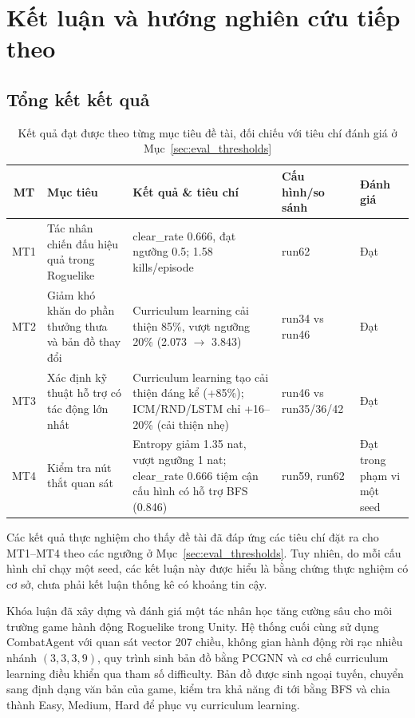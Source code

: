 \clearpage
{}

\setcounter{chapter}{4}
\chapter[{KẾT LUẬN VÀ HƯỚNG NGHIÊN CỨU TIẾP THEO}]{Kết luận và hướng nghiên cứu tiếp theo}

\section{Tổng kết kết quả}

\begin{table}[H]
    \centering
    \small
    \caption{Kết quả đạt được theo từng mục tiêu đề tài, đối chiếu với tiêu chí đánh giá ở Mục~\ref{sec:eval_thresholds}}
    \label{tab:mt_results_summary}
    \begin{tabular}{|c|p{3.8cm}|p{4.0cm}|p{2.3cm}|p{1.6cm}|}
        \hline
        \textbf{MT} & \textbf{Mục tiêu} & \textbf{Kết quả \& tiêu chí} & \textbf{Cấu hình/so sánh} & \textbf{Đánh giá} \\
        \hline
        MT1 & Tác nhân chiến đấu hiệu quả trong Roguelike & clear\_rate 0.666, đạt ngưỡng 0.5; 1.58 kills/episode & run62 & Đạt \\
        \hline
        MT2 & Giảm khó khăn do phần thưởng thưa và bản đồ thay đổi & Curriculum learning cải thiện 85\%, vượt ngưỡng 20\% (2.073 $\rightarrow$ 3.843) & run34 vs run46 & Đạt \\
        \hline
        MT3 & Xác định kỹ thuật hỗ trợ có tác động lớn nhất & Curriculum learning tạo cải thiện đáng kể (+85\%); ICM/RND/LSTM chỉ +16--20\% (cải thiện nhẹ) & run46 vs run35/36/42 & Đạt \\
        \hline
        MT4 & Kiểm tra nút thắt quan sát & Entropy giảm 1.35 nat, vượt ngưỡng 1 nat; clear\_rate 0.666 tiệm cận cấu hình có hỗ trợ BFS (0.846) & run59, run62 & Đạt trong phạm vi một seed \\
        \hline
    \end{tabular}
\end{table}

\noindent Các kết quả thực nghiệm cho thấy đề tài đã đáp ứng các tiêu chí đặt ra cho MT1--MT4 theo các ngưỡng ở Mục~\ref{sec:eval_thresholds}. Tuy nhiên, do mỗi cấu hình chỉ chạy một seed, các kết luận này được hiểu là bằng chứng thực nghiệm có cơ sở, chưa phải kết luận thống kê có khoảng tin cậy.

Khóa luận đã xây dựng và đánh giá một tác nhân học tăng cường sâu cho môi trường game hành động Roguelike trong Unity. Hệ thống cuối cùng sử dụng CombatAgent với quan sát vector 207 chiều, không gian hành động rời rạc nhiều nhánh $(3,3,3,9)$, quy trình sinh bản đồ bằng PCGNN và cơ chế curriculum learning điều khiển qua tham số difficulty. Bản đồ được sinh ngoại tuyến, chuyển sang định dạng văn bản của game, kiểm tra khả năng đi tới bằng BFS và chia thành Easy, Medium, Hard để phục vụ curriculum learning.

